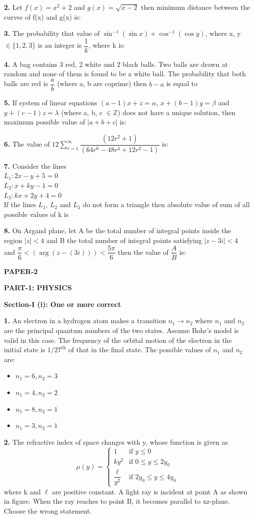 \documentclass[10pt,twocolumn]{extarticle}
\newenvironment{qoptions}{\begin{itemize}[leftmargin=1.8em,itemsep=2pt,topsep=2pt,label={}]}{\end{itemize}}
\newcommand{\opt}[2]{\item[({#1})] {#2}}
\newcommand{\sectionhdr}[1]{\par\vspace{4pt}\noindent\textbf{\large #1}\par\vspace{2pt}}
\newcommand{\subsectionhdr}[1]{\par\vspace{3pt}\noindent\textbf{#1}\par\vspace{2pt}}
\begin{document}
\textbf{2.} Let $f(x)=x^2+2$ and $g(x)=\sqrt{x-2}$ then minimum distance between the curves of f(x) and g(x) is:

\textbf{3.} The probability that value of $\sin^{-1}(\sin x)+\cos^{-1}(\cos y)$, where x, y $\in\{1,2,3\}$ is an integer is $\dfrac1k$, where k is:

\textbf{4.} A bag contains 3 red, 2 white and 2 black balls. Two balls are drawn at random and none of them is found to be a white ball. The probability that both balls are red is $\dfrac ab$ (where a, b are coprime) then $b-a$ is equal to

\textbf{5.} If system of linear equations $(a-1)x+z=\alpha$, $x+(b-1)y=\beta$ and $y+(c-1)z=\lambda$ (where a, b, c $\in\mathbb{Z}$) does not have a unique solution, then maximum possible value of $|a+b+c|$ is:

\textbf{6.} The value of $12\displaystyle\sum_{r=1}^{\infty}\dfrac{(12r^2+1)}{(64r^6-48r^4+12r^2-1)}$ is:

\textbf{7.} Consider the lines\\
$L_1: 2x-y+5=0$\\
$L_2: x+ky-1=0$\\
$L_3: kx+2y+4=0$\\
If the lines $L_1$, $L_2$ and $L_3$ do not form a triangle then absolute value of sum of all possible values of k is

\textbf{8.} On Argand plane, let A be the total number of integral points inside the region $|z|<4$ and B the total number of integral points satisfying $|z-3i|<4$ and $\dfrac{\pi}{6}<(\arg(z-(3i)))<\dfrac{5\pi}{6}$ then the value of $\dfrac AB$ is:

\sectionhdr{PAPER-2}

\sectionhdr{PART-1: PHYSICS}
\subsectionhdr{Section-I (i): One or more correct}

\textbf{1.} An electron in a hydrogen atom makes a transition $n_1\to n_2$ where $n_1$ and $n_2$ are the principal quantum numbers of the two states. Assume Bohr's model is valid in this case. The frequency of the orbital motion of the electron in the initial state is $1/27^{\text{th}}$ of that in the final state. The possible values of $n_1$ and $n_2$ are:

\begin{qoptions}
\opt{A}{$n_1=6,n_2=3$}
\opt{B}{$n_1=4,n_2=2$}
\opt{C}{$n_1=8,n_2=1$}
\opt{D}{$n_1=3,n_2=1$}
\end{qoptions}

\textbf{2.} The refractive index of space changes with y, whose function is given as
\[\mu(y)=\begin{cases}1 & \text{if } y\le0\\ ky^2 & \text{if } 0\le y\le2y_0\\ \dfrac{\ell}{y^2} & \text{if } 2y_0\le y\le4y_0\end{cases}\]
where k and $\ell$ are positive constant. A light ray is incident at point A as shown in figure. When the ray reaches to point B, it becomes parallel to xz-plane. Choose the wrong statement.
\end{document}

